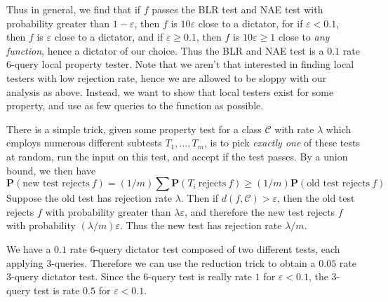 Thus in general, we find that if $f$ passes the BLR test and NAE test with probability greater than $1 - \varepsilon$, then $f$ is $10 \varepsilon$ close to a dictator, for if $\varepsilon < 0.1$, then $f$ is $\varepsilon$ close to a dictator, and if $\varepsilon \geq 0.1$, then $f$ is $10 \varepsilon \geq 1$ close to {\it any function}, hence a dictator of our choice. Thus the BLR and NAE test is a $0.1$ rate 6-query local property tester. Note that we aren't that interested in finding local testers with low rejection rate, hence we are allowed to be sloppy with our analysis as above. Instead, we want to show that local testers exist for some property, and use as few queries to the function as possible.

There is a simple trick, given some property test for a class $\mathcal{C}$ with rate $\lambda$ which employs numerous different subtests $T_1, \dots, T_m$, is to pick {\it exactly one} of these tests at random, run the input on this test, and accept if the test passes. By a union bound, we then have
%
\[ \mathbf{P}(\text{new test rejects}\ f) = (1/m) \sum \mathbf{P}(T_i\ \text{rejects}\ f) \geq (1/m) \mathbf{P}(\text{old test rejects}\ f) \]
%
Suppose the old test has rejection rate $\lambda$. Then if $d(f,\mathcal{C}) > \varepsilon$, then the old test rejects $f$ with probability greater than $\lambda \varepsilon$, and therefore the new test rejects $f$ with probability $(\lambda/m) \varepsilon$. Thus the new test has rejection rate $\lambda/m$.

\begin{example}
    We have a $0.1$ rate 6-query dictator test composed of two different tests, each applying 3-queries. Therefore we can use the reduction trick to obtain a $0.05$ rate 3-query dictator test. Since the 6-query test is really rate $1$ for $\varepsilon < 0.1$, the 3-query test is rate $0.5$ for $\varepsilon < 0.1$.
\end{example}

